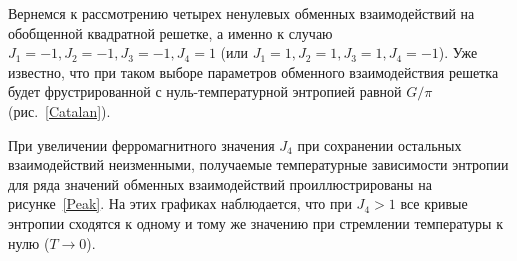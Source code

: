 \documentclass[utf8,12pt]{jetp}
\begin{document}
Вернемся к рассмотрению четырех ненулевых обменных взаимодействий на обобщенной квадратной решетке, а именно к случаю $J_1 = -1, J_2 = -1, J_3 = -1, J_4 = 1$ (или $J_1 = 1, J_2 = 1, J_3 = 1, J_4 = -1$). Уже известно, что при таком выборе параметров обменного взаимодействия решетка будет фрустрированной с нуль-температурной энтропией равной $G/\pi$ (рис.~\ref{Catalan}). 

При увеличении ферромагнитного значения $J_4$ при сохранении остальных взаимодействий неизменными, получаемые температурные зависимости энтропии для ряда значений обменных взаимодействий проиллюстрированы на рисунке~\ref{Peak}. На этих графиках наблюдается, что при $J_4>1$ все кривые энтропии сходятся к одному и тому же значению при стремлении температуры к нулю ($T \rightarrow 0$). 

\begin{figure}[h]
	\begin{minipage}[h]{0.5\linewidth}
	\end{minipage}
	\hfill
	\begin{minipage}[h]{0.5\linewidth}

\end{minipage}
\end{figure}
\end{document}
